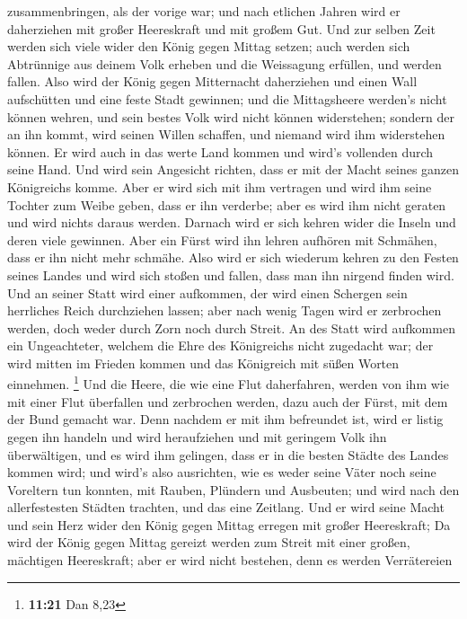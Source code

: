 zusammenbringen, als der vorige war; und nach etlichen Jahren wird er
daherziehen mit großer Heereskraft und mit großem Gut. 
Und zur selben Zeit werden sich viele wider den König gegen Mittag
setzen; auch werden sich Abtrünnige aus deinem Volk erheben und die
Weissagung erfüllen, und werden fallen.  Also wird der
König gegen Mitternacht daherziehen und einen Wall aufschütten und eine
feste Stadt gewinnen; und die Mittagsheere werden's nicht können wehren,
und sein bestes Volk wird nicht können widerstehen; 
sondern der an ihn kommt, wird seinen Willen schaffen, und niemand wird
ihm widerstehen können. Er wird auch in das werte Land kommen und wird's
vollenden durch seine Hand.  Und wird sein Angesicht
richten, dass er mit der Macht seines ganzen Königreichs komme. Aber er
wird sich mit ihm vertragen und wird ihm seine Tochter zum Weibe geben,
dass er ihn verderbe; aber es wird ihm nicht geraten und wird nichts
daraus werden.  Darnach wird er sich kehren wider die
Inseln und deren viele gewinnen. Aber ein Fürst wird ihn lehren aufhören
mit Schmähen, dass er ihn nicht mehr schmähe.  Also wird
er sich wiederum kehren zu den Festen seines Landes und wird sich stoßen
und fallen, dass man ihn nirgend finden wird.  Und an
seiner Statt wird einer aufkommen, der wird einen Schergen sein
herrliches Reich durchziehen lassen; aber nach wenig Tagen wird er
zerbrochen werden, doch weder durch Zorn noch durch Streit.
 An des Statt wird aufkommen ein Ungeachteter, welchem
die Ehre des Königreichs nicht zugedacht war; der wird mitten im Frieden
kommen und das Königreich mit süßen Worten einnehmen. \footnote{\textbf{11:21}
  Dan 8,23}  Und die Heere, die wie eine Flut
daherfahren, werden von ihm wie mit einer Flut überfallen und zerbrochen
werden, dazu auch der Fürst, mit dem der Bund gemacht war.
 Denn nachdem er mit ihm befreundet ist, wird er listig
gegen ihn handeln und wird heraufziehen und mit geringem Volk ihn
überwältigen,  und es wird ihm gelingen, dass er in die
besten Städte des Landes kommen wird; und wird's also ausrichten, wie es
weder seine Väter noch seine Voreltern tun konnten, mit Rauben, Plündern
und Ausbeuten; und wird nach den allerfestesten Städten trachten, und
das eine Zeitlang.  Und er wird seine Macht und sein Herz
wider den König gegen Mittag erregen mit großer Heereskraft; Da wird der
König gegen Mittag gereizt werden zum Streit mit einer großen, mächtigen
Heereskraft; aber er wird nicht bestehen, denn es werden Verrätereien
